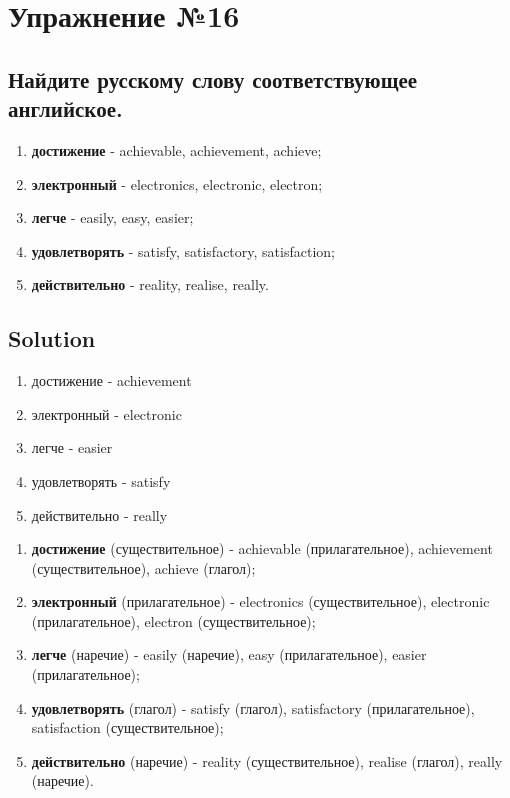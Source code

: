 \section{Упражнение №16}
\subsection*{Найдите русскому слову соответствующее английское.}

\begin{enumerate}
      \item \textbf{достижение} - achievable, achievement, achieve;
      \item \textbf{электронный} - electronics, electronic, electron;
      \item \textbf{легче} - easily, easy, easier;
      \item \textbf{удовлетворять} - satisfy, satisfactory, satisfaction;
      \item \textbf{действительно} - reality, realise, really.
\end{enumerate}

\subsection*{Solution}
\begin{enumerate}
      \item достижение - achievement
      \item электронный - electronic
      \item легче - easier
      \item удовлетворять - satisfy
      \item действительно - really
\end{enumerate}

\begin{enumerate}
      \item \textbf{достижение} (существительное) - achievable (прилагательное), achievement (существительное), achieve (глагол);
      \item \textbf{электронный} (прилагательное) - electronics (существительное), electronic (прилагательное), electron (существительное);
      \item \textbf{легче} (наречие) - easily (наречие), easy (прилагательное), easier (прилагательное);
      \item \textbf{удовлетворять} (глагол) - satisfy (глагол), satisfactory (прилагательное), satisfaction (существительное);
      \item \textbf{действительно} (наречие) - reality (существительное), realise (глагол), really (наречие).
\end{enumerate}

